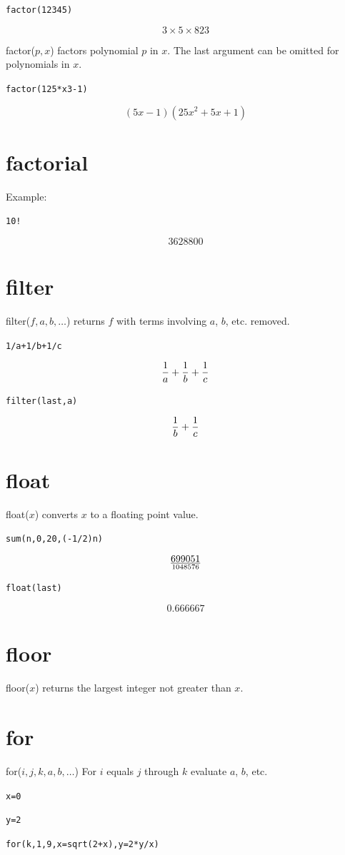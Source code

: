 \documentclass[11pt]{article}
\begin{document}
\medskip
{\tt factor(12345)}

$$3\times 5\times 823$$

\medskip
\noindent
factor($p,x$) factors polynomial $p$ in $x$.
The last argument can be omitted for polynomials in $x$.

\medskip
{\tt factor(125*x{}3-1)}

$$(5x-1)(25x^2+5x+1)$$

\section*{factorial}
Example:

\medskip
{\tt 10!}

$$3628800$$

\section*{filter}
filter($f,a,b,\ldots$) returns $f$ with terms involving $a$, $b$, etc. removed.

\medskip
{\tt 1/a+1/b+1/c}

$${1\over a}+{1\over b}+{1\over c}$$

{\tt filter(last,a)}

$${1\over b}+{1\over c}$$

\section*{float}
float($x$) converts $x$ to a floating point value.

\medskip
{\tt sum(n,0,20,(-1/2){}n)}

$$699051\over1048576$$

{\tt float(last)}

$$0.666667$$

\section*{floor}
floor($x$) returns the largest integer not greater than $x$.

\section*{for}
for($i,j,k,a,b,\ldots$) For $i$ equals $j$ through $k$ evaluate $a$, $b$, etc.

\medskip
{\tt x=0}

{\tt y=2}

{\tt for(k,1,9,x=sqrt(2+x),y=2*y/x)}
\end{document}
